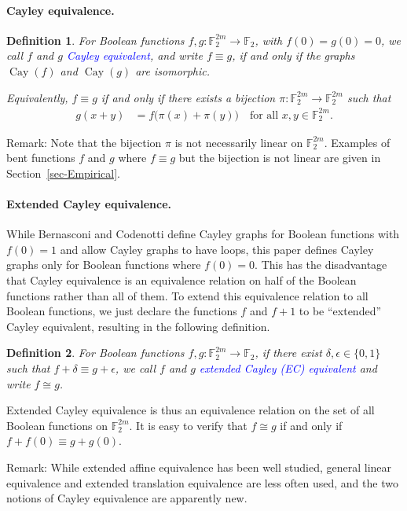 \documentclass[12pt,a4paper]{article}
\newcommand{\mb}[1]{\mathbb{#1}}
\newcommand{\F}{\mb{F}}
\newcommand{\To}{\rightarrow}
\newcommand{\Emph}[1]{\emph{\textcolor{blue}{#1}}}
\newcommand{\Cay}[1]{\operatorname{Cay}\left(#1\right)}
\newtheorem{Definition}{Definition}
\begin{document}
\paragraph*{Cayley equivalence.}
\begin{Definition}
%
For Boolean functions $f, g : \F_2^{2m} \To \F_2$, with $f(0)=g(0)=0$,
we call $f$ and $g$ \Emph{Cayley equivalent},
and write $f \equiv g$,
if and only if the graphs $\Cay{f}$ and $\Cay{g}$ are isomorphic.

Equivalently, $f \equiv g$ if and only if
there exists a bijection $\pi : \F_2^{2m} \To \F_2^{2m}$ such that
\begin{align*}
g(x+y) &= f \big(\pi(x)+\pi(y)\big) \quad \text{for all~} x,y \in \F_2^{2m}.
\end{align*}
\end{Definition}
Remark: Note that the bijection $\pi$ is not necessarily linear on $\F_2^{2m}$.
Examples of bent functions $f$ and $g$ where $f \equiv g$ but the bijection is not linear
are given in Section~\ref{sec-Empirical}.
\paragraph*{Extended Cayley equivalence.}
%
While Bernasconi and Codenotti \cite{BerC99} define Cayley graphs for Boolean functions with
$f(0)=1$ and allow Cayley graphs to have loops, this paper defines Cayley
graphs only for Boolean functions where $f(0)=0$.
This has the disadvantage that Cayley equivalence is an equivalence relation on half
of the Boolean functions rather than all of them.
To extend this equivalence relation to all Boolean functions,
we just declare the functions $f$ and $f+1$ to be ``extended'' Cayley equivalent,
resulting in the following definition.
\begin{Definition}
For Boolean functions $f, g : \F_2^{2m} \To \F_2$,
if there exist $\delta, \epsilon \in \{0,1\}$ such that $f + \delta \equiv g + \epsilon$,
we call $f$ and $g$ \Emph{extended Cayley (EC) equivalent} and write $f \cong g$.
\end{Definition}
Extended Cayley equivalence is thus an equivalence relation on the set of all Boolean functions on
$\F_2^{2m}$.
It is easy to verify that $f \cong g$ if and only if $f+f(0) \equiv g+g(0)$.

Remark: While extended affine equivalence has been well studied,
general linear equivalence and extended translation equivalence are less often used,
and the two notions of Cayley equivalence are apparently new.
\end{document}
